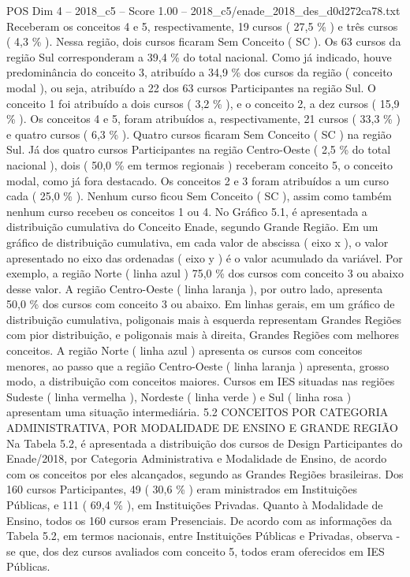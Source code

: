 \begin{textsample}{POS Dim 4 – 2018\_c5 – Score 1.00 – 2018\_c5/enade\_2018\_des\_d0d272ca78.txt}
Receberam os conceitos 4 e 5, respectivamente, 19 cursos ( 27,5 \% ) e três cursos ( 4,3 \% ).
Nessa região, dois cursos ficaram Sem Conceito ( SC ).
Os 63 cursos da região Sul corresponderam a 39,4 \% do total nacional.
Como já indicado, houve predominância do conceito 3, atribuído a 34,9 \% dos cursos da região ( conceito modal ), ou seja, atribuído a 22 dos 63 cursos Participantes na região Sul.
O conceito 1 foi atribuído a dois cursos ( 3,2 \% ), e o conceito 2, a dez cursos ( 15,9 \% ).
Os conceitos 4 e 5, foram atribuídos a, respectivamente, 21 cursos ( 33,3 \% ) e quatro cursos ( 6,3 \% ).
Quatro cursos ficaram Sem Conceito ( SC ) na região Sul.
Já dos quatro cursos Participantes na região Centro-Oeste ( 2,5 \% do total nacional ), dois ( 50,0 \% em termos regionais ) receberam conceito 5, o conceito modal, como já fora destacado.
Os conceitos 2 e 3 foram atribuídos a um curso cada ( 25,0 \% ).
Nenhum curso ficou Sem Conceito ( SC ), assim como também nenhum curso recebeu os conceitos 1 ou 4.
No Gráfico 5.1, é apresentada a distribuição cumulativa do Conceito Enade, segundo Grande Região.
Em um gráfico de distribuição cumulativa, em cada valor de abscissa ( eixo x ), o valor apresentado no eixo das ordenadas ( eixo y ) é o valor acumulado da variável.
Por exemplo, a região Norte ( linha azul ) 75,0 \% dos cursos com conceito 3 ou abaixo desse valor.
A região Centro-Oeste ( linha laranja ), por outro lado, apresenta 50,0 \% dos cursos com conceito 3 ou abaixo.
Em linhas gerais, em um gráfico de distribuição cumulativa, poligonais mais à esquerda representam Grandes Regiões com pior distribuição, e poligonais mais à direita, Grandes Regiões com melhores conceitos.
A região Norte ( linha azul ) apresenta os cursos com conceitos menores, ao passo que a região Centro-Oeste ( linha laranja ) apresenta, grosso modo, a distribuição com conceitos maiores.
Cursos em IES situadas nas regiões Sudeste ( linha vermelha ), Nordeste ( linha verde ) e Sul ( linha rosa ) apresentam uma situação intermediária. 5.2 CONCEITOS POR CATEGORIA ADMINISTRATIVA, POR MODALIDADE DE ENSINO E GRANDE REGIÃO Na Tabela 5.2, é apresentada a distribuição dos cursos de Design Participantes do Enade/2018, por Categoria Administrativa e Modalidade de Ensino, de acordo com os conceitos por eles alcançados, segundo as Grandes Regiões brasileiras.
Dos 160 cursos Participantes, 49 ( 30,6 \% ) eram ministrados em Instituições Públicas, e 111 ( 69,4 \% ), em Instituições Privadas.
Quanto à Modalidade de Ensino, todos os 160 cursos eram Presenciais.
De acordo com as informações da Tabela 5.2, em termos nacionais, entre Instituições Públicas e Privadas, observa -se que, dos dez cursos avaliados com conceito 5, todos eram oferecidos em IES Públicas.

\end{textsample}
